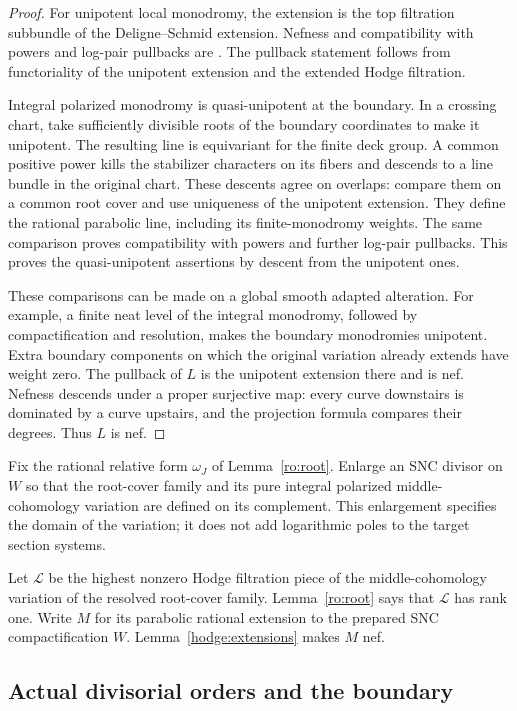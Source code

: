 \begin{proof}
For unipotent local monodromy, the extension is the top filtration
subbundle of the Deligne--Schmid extension. Nefness and compatibility
with powers and log-pair pullbacks are
\cite[Lemmas~2.16 and~5.6]{BFMT}.
The pullback statement follows from functoriality of the unipotent
extension and the extended Hodge filtration.

Integral polarized monodromy is quasi-unipotent at the boundary.
In a crossing chart, take sufficiently divisible roots of the boundary
coordinates to make it unipotent. The resulting line is equivariant
for the finite deck group. A common positive power kills the
stabilizer characters on its fibers and descends to a line bundle in
the original chart. These descents agree on overlaps: compare them on
a common root cover and use uniqueness of the unipotent extension.
They define the rational parabolic line, including its finite-monodromy
weights. The same comparison proves compatibility with powers and
further log-pair pullbacks. This proves the quasi-unipotent assertions
by descent from the unipotent ones.

These comparisons can be made on a global smooth adapted alteration.
For example, a finite neat level of the integral monodromy, followed
by compactification and resolution, makes the boundary monodromies
unipotent. Extra boundary components on which the original variation
already extends have weight zero. The pullback of $L$ is the unipotent
extension there and is nef. Nefness descends under a proper surjective
map: every curve downstairs is dominated by a curve upstairs, and the
projection formula compares their degrees. Thus $L$ is nef.
\end{proof}

Fix the rational relative form $\omega_J$ of Lemma~\ref{ro:root}.  Enlarge
an SNC divisor on $W$ so that the root-cover family and its pure integral
polarized middle-cohomology variation are defined on its complement.
This enlargement specifies the domain of the variation; it does not
add logarithmic poles to the target section systems.

Let $\mathcal L$ be the highest nonzero Hodge filtration piece of the
middle-cohomology variation of the resolved root-cover family.
Lemma~\ref{ro:root} says that $\mathcal L$ has rank one.  Write $M$ for
its parabolic rational extension to the prepared SNC compactification
$W$.  Lemma~\ref{hodge:extensions} makes $M$ nef.

\subsection{Actual divisorial orders and the boundary}

